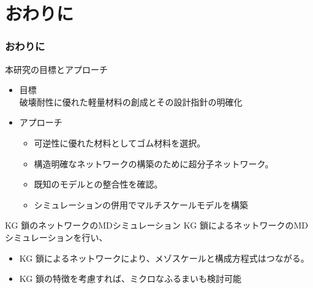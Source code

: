 \documentclass[11pt, dvipdfmx]{beamer}
\begin{document}
\section{おわりに}

\begin{frame}
\frametitle{おわりに}

\begin{exampleblock}{本研究の目標とアプローチ}
\begin{itemize}
\item
目標\\
破壊耐性に優れた軽量材料の創成とその設計指針の明確化
\item
アプローチ
	\begin{itemize}
	\item
	可逆性に優れた材料としてゴム材料を選択。
	\item
	構造明確なネットワークの構築のために超分子ネットワーク。
	\item
	既知のモデルとの整合性を確認。
	\item
	\color{red}シミュレーションの併用でマルチスケールモデルを構築\color{black}
	\end{itemize}
\end{itemize}
\end{exampleblock}


\begin{block}{KG 鎖のネットワークのMDシミュレーション}
KG 鎖によるネットワークのMDシミュレーションを行い、
\begin{itemize}
\item
KG 鎖によるネットワークにより、メゾスケールと構成方程式はつながる。
\item
KG 鎖の特徴を考慮すれば、ミクロなふるまいも検討可能
\end{itemize}
\end{block}

\end{frame}
\end{document}
